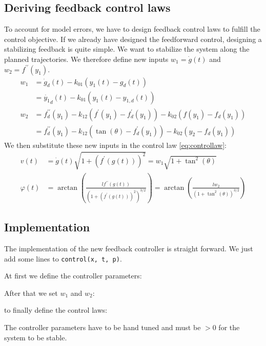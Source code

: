 \documentclass[a4paper,11pt,headings=standardclasses,parskip=half]{scrartcl}
\newcommand{\listcode}[3]{}
\newcommand{\listcodefbcontrol}[2]{\listcode{#1}{#2}{../sim/03_car_feedback_control.py}}
\begin{document}
\subsection{Deriving feedback control laws}
To account for model errors, we have to design feedback control laws to fulfill the control objective. If we already have designed the feedforward control, designing a stabilizing feedback is quite simple. 
We want to stabilize the system along the planned trajectories. We therefore define new inputs $w_1=\dot{g}(t)$ and $w_2 = f^{\prime\prime}(y_1)$.
\begin{align*}
w_1 &= \dot{g}_d(t) - k_{01}(y_1(t)-g_d(t)) \\&= \dot{y_1}_d(t) - k_{01}(y_1(t)-y_{1,d}(t)) \\
w_2 &= f_d^{\prime\prime}(y_1) -  k_{12}(f^\prime(y_1) - f^\prime_d(y_1)) - k_{02}(f(y_1) - f_d(y_1)) \\
&= f_d^{\prime\prime}(y_1) -  k_{12}(\tan(\theta) - f^\prime_d(y_1)) - k_{02}(y_2 - f_d(y_1))
\end{align*}
We then substitute these new inputs in the control law \eqref{eq:controllaw}:
\begin{subequations}
\label{eq:fbcontrollaw}
\begin{align}
v(t) &= \dot g(t) \sqrt{1 + (f^\prime(g(t)))^2}
	= w_1 \sqrt{1 + \tan^2(\theta)} \\
\varphi(t) &= \arctan\left(\frac{lf^{\prime\prime}(g(t))}{\left(1 + (f^\prime(g(t)))^2\right)^{3/2}}\right) 
	 = \arctan\left(\frac{lw_2}{\left(1 + \tan^2(\theta)\right)^{3/2}}\right)
\end{align}
\end{subequations}
\subsection{Implementation}
The implementation of the new feedback controller is straight forward. We just add some lines to \texttt{control(x, t, p)}.

At first we define the controller parameters:
\listcodefbcontrol{91}{94}
After that we set $w_1$ and $w_2$:
\listcodefbcontrol{96}{103}
to finally define the control laws:
\listcodefbcontrol{105}{109}
The controller parameters have to be hand tuned and must be $>0$ for the system to be stable.
\end{document}

